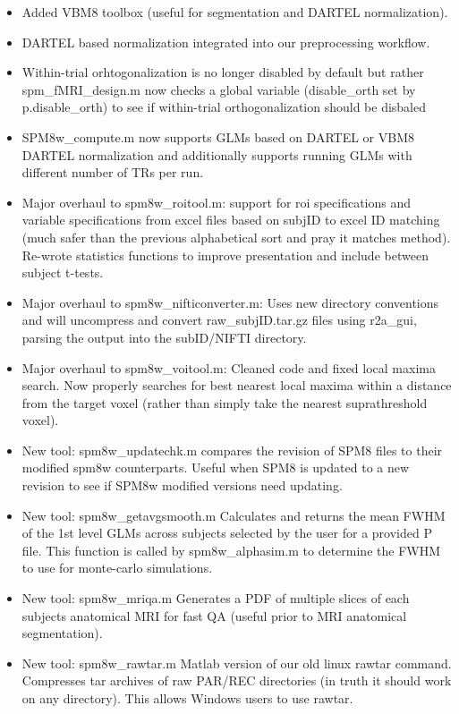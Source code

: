 \documentclass[12pt]{article}
\begin{document}
\begin{itemize}
	\item Added VBM8 toolbox (useful for segmentation and DARTEL normalization).
	\item DARTEL based normalization integrated into our preprocessing workflow. 
	\item Within-trial orhtogonalization is no longer disabled by default but rather \newline spm\_fMRI\_design.m now checks a global variable (disable\_orth set by p.disable\_orth) to see if within-trial orthogonalization should be disbaled
	\item SPM8w\_compute.m now supports GLMs based on DARTEL or VBM8 DARTEL normalization and additionally supports running GLMs with different number of TRs per run. 
	\item Major overhaul to spm8w\_roitool.m: support for roi specifications and variable specifications from excel files based on subjID to excel ID matching (much safer than the previous alphabetical sort and pray it matches method). Re-wrote statistics functions to improve presentation and include between subject t-tests.  
	\item Major overhaul to spm8w\_nifticonverter.m: Uses new directory conventions and will uncompress and convert raw\_subjID.tar.gz files using r2a\_gui, parsing the output into the subID/NIFTI directory. 
	\item Major overhaul to spm8w\_voitool.m: Cleaned code and fixed local maxima search. Now properly searches for best nearest local maxima within a distance from the target voxel (rather than simply take the nearest suprathreshold voxel). 
	\item New tool: spm8w\_updatechk.m compares the revision of SPM8 files to their modified spm8w counterparts. Useful when SPM8 is updated to a new revision to see if SPM8w modified versions need updating.
	\item New tool: spm8w\_getavgsmooth.m Calculates and returns the mean FWHM of the 1st level GLMs across subjects selected by the user for a provided P file. This function is called by spm8w\_alphasim.m to determine the FWHM to use for monte-carlo simulations. 
	\item New tool: spm8w\_mriqa.m Generates a PDF of multiple slices of each subjects anatomical MRI for fast QA (useful prior to MRI anatomical segmentation). 
	\item New tool: spm8w\_rawtar.m Matlab version of our old linux rawtar command. Compresses tar archives of raw PAR/REC directories (in truth it should work on any directory). This allows Windows users to use rawtar.  

\end{itemize}
\end{document}
